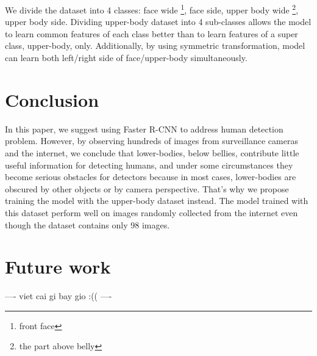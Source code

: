 \documentclass[conference]{IEEEtran}
\begin{document}
We divide the dataset into 4 classes: face wide \footnote{front face}, face side, upper body wide \footnote{the part above belly}, upper body side. Dividing upper-body dataset into 4 sub-classes allows the model to learn common features of each class better than to learn features of a super class, upper-body, only. Additionally, by using symmetric transformation, model can learn both left/right side of face/upper-body simultaneously.
\FloatBarrier


\section{Conclusion}

In this paper, we suggest using Faster R-CNN to address human detection problem. However, by observing hundreds of images from surveillance cameras and the internet, we conclude that lower-bodies, below bellies, contribute little useful information for detecting humans, and under some circumstances they become serious obstacles for detectors because in most cases, lower-bodies are obscured by other objects or by camera perspective. That's why we propose training the model with the upper-body dataset instead. The model trained with this dataset perform well on images randomly collected from the internet even though the dataset contains only 98 images. 
\section{Future work}
---- viet cai gi bay gio :(( ----












%
%
%
\FloatBarrier



\end{document}
